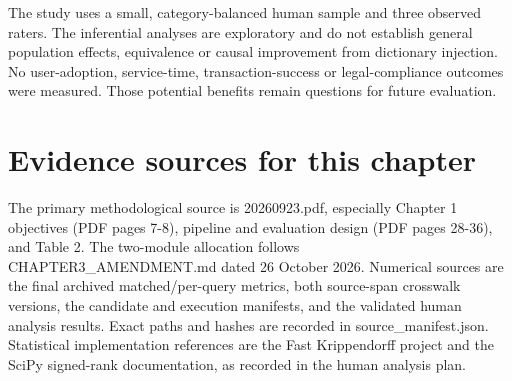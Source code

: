 The study uses a small, category-balanced human sample and three observed raters. The inferential analyses are exploratory and do not establish general population effects, equivalence or causal improvement from dictionary injection. No user-adoption, service-time, transaction-success or legal-compliance outcomes were measured. Those potential benefits remain questions for future evaluation.


\section{Evidence sources for this chapter}

The primary methodological source is 20260923.pdf, especially Chapter 1 objectives (PDF pages 7-8), pipeline and evaluation design (PDF pages 28-36), and Table 2. The two-module allocation follows CHAPTER3\_AMENDMENT.md dated 26 October 2026. Numerical sources are the final archived matched/per-query metrics, both source-span crosswalk versions, the candidate and execution manifests, and the validated human analysis results. Exact paths and hashes are recorded in source\_manifest.json. Statistical implementation references are the Fast Krippendorff project and the SciPy signed-rank documentation, as recorded in the human analysis plan.

